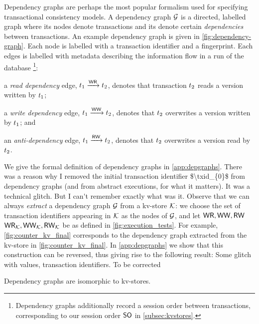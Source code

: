 Dependency graphs \cite{adya-icde,adya} are perhaps the most popular 
formalism used for specifying transactional consistency models. 
A dependency graph $\mathcal{G}$ is a directed, labelled graph where its
nodes denote transactions and its denote certain \emph{dependencies} between transactions.  
An example dependency graph is given in \cref{fig:dependency-graph}.
Each node is labelled with a transaction identifier and a fingerprint.
Each edges is labelled with metadata describing the information flow in a run of the database%
\footnote{Dependency graphs additionally record a session order between transactions, corresponding to our session order $\mathsf{SO}$ in \cref{subsec:kvstores}.}:
\begin{enumerate*}
	\item a \emph{read dependency} edge, $t_1 \xrightarrow{\mathsf{WR}} t_2$, denotes
that transaction $t_2$ reads a version written by $t_1$;
	\item a \emph{write dependency} edge, $t_1 \xrightarrow{\mathsf{WW}} t_2$, denotes that $t_2$ overwrites a version written by $t_1$; and 
	\item an \emph{anti-dependency} edge, $t_1 \xrightarrow{\mathsf{RW}} t_2$, denotes that $t_2$ overwrites a version read by $t_2$. 
\end{enumerate*}
We give the formal definition of dependency graphs in \cref{app:depgraphs}.
%
\ac{There was a reason why I removed the initial transaction identifier $\txid_{0}$ 
from dependency graphs (and from abstract executions, for what it matters). It was 
a technical glitch. But I can't remember exactly what was it.}
%
Observe that we can always \emph{extract} a dependency graph  $\mathcal{G}$ from a kv-store $\mathcal{K}$:
we choose the set of transaction identifiers appearing in $\mathcal{K}$ as the nodes of $\mathcal{G}$, 
and let $\mathsf{WR}, \mathsf{WW}, \mathsf{RW}$  $\mathsf{WR}_{\mathcal{K}}, \mathsf{WW}_{\mathcal{K}}, \mathsf{RW}_{\mathcal{K}}$ be as defined in \cref{fig:execution_tests}.
For example, \cref{fig:counter_kv_final} corresponds to the dependency graph extracted from the kv-store in \cref{fig:counter_kv_final}.
In \cref{app:depgraphs} we show that this construction can be reversed, thus giving 
rise to the following result: 
%
\ac{Some glitch with values, transaction identifiers. To be corrected} 
\begin{theorem}
\label{thm:kv_graph_isomorph}
Dependency graphs are isomorphic to kv-stores.
\end{theorem}

